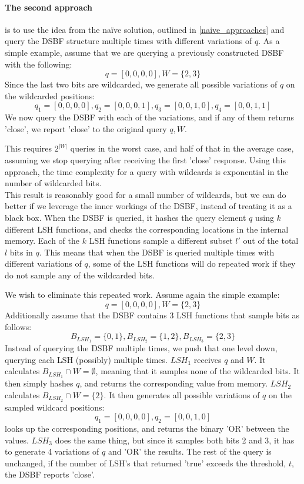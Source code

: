 \documentclass[a4paper,11pt]{article}
\begin{document}
\paragraph{The second approach} is to use the idea from the naïve solution, outlined in \ref{naive_approaches} and query the DSBF structure multiple times with different variations of $q$. As a simple example, assume that we are querying a previously constructed DSBF with the following:
\[q=[0,0,0,0], W=\{2,3\}\]
Since the last two bits are wildcarded, we generate all possible variations of $q$ on the wildcarded positions:
\[q_1=[0,0,0,0], q_2=[0,0,0,1], q_3=[0,0,1,0], q_4=[0,0,1,1]\]
We now query the DSBF with each of the variations, and if any of them returns 'close', we report 'close' to the original query $q, W$.

This requires $2^{|W|}$ queries in the worst case, and half of that in the average case, assuming we stop querying after receiving the first 'close' response. Using this approach, the time complexity for a query with wildcards is exponential in the number of wildcarded bits.\\

This result is reasonably good for a small number of wildcards, but we can do better if we leverage the inner workings of the DSBF, instead of treating it as a black box.
When the DSBF is queried, it hashes the query element $q$ using $k$ different LSH functions, and checks the corresponding locations in the internal memory. Each of the $k$ LSH functions sample a different subset $l'$ out of the total $l$ bits in $q$. This means that when the DSBF is queried multiple times with different variations of $q$, some of the LSH functions will do repeated work if they do not sample any of the wildcarded bits.

We wish to eliminate this repeated work. Assume again the simple example:
\[q=[0,0,0,0], W=\{2,3\}\]
Additionally assume that the DSBF contains 3 LSH functions that sample bits as follows:
\[B_{LSH_1}=\{0,1\}, B_{LSH_2}=\{1,2\}, B_{LSH_3}=\{2,3\}\]
Instead of querying the DSBF multiple times, we push that one level down, querying each LSH (possibly) multiple times.
$LSH_1$ receives $q$ and $W$. It calculates $B_{LSH_1} \cap W = \emptyset $, meaning that it samples none of the wildcarded bits. It then simply hashes $q$, and returns the corresponding value from memory.
$LSH_2$ calculates $B_{LSH_2} \cap W = \{2\}$. It then generates all possible variations of $q$ on the sampled wildcard positions:
\[q_1=[0,0,0,0], q_2=[0,0,1,0]\]
looks up the corresponding positions, and returns the binary 'OR' between the values.
$LSH_3$ does the same thing, but since it samples both bits 2 and 3, it has to generate 4 variations of $q$ and 'OR' the results.
The rest of the query is unchanged, if the number of LSH's that returned 'true' exceeds the threshold, $t$, the DSBF reports 'close'.\\
\end{document}
